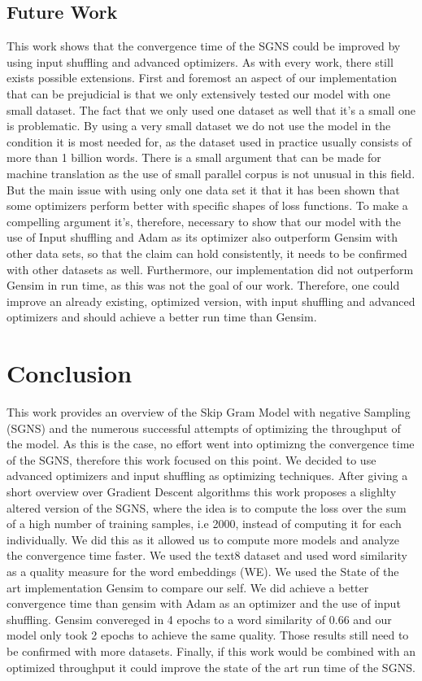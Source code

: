 \documentclass[conference]{IEEEtran}
\begin{document}
\subsection{Future Work}
This work shows that the convergence time of the SGNS could be improved by using input shuffling and advanced optimizers. As with every work, there still exists possible extensions. First and foremost an aspect of our implementation that can be prejudicial is that we only extensively tested our model with one small dataset. The fact that we only used one dataset as well that it's a small one is problematic. By using a very small dataset we do not use the model in the condition it is most needed for, as the dataset used in practice usually consists of more than 1 billion words. There is a small argument that can be made for machine translation as the use of small parallel corpus is not unusual in this field. But the main issue with using only one data set it that it has been shown that some optimizers perform better with specific shapes of loss functions. To make a compelling argument it's, therefore, necessary to show that our model with the use of Input shuffling and Adam as its optimizer also outperform Gensim with other data sets, so that the claim can hold consistently, it needs to be confirmed with other datasets as well.
Furthermore, our implementation did not outperform Gensim in run time, as this was not the goal of our work. Therefore, one could improve an already existing, optimized version, with input shuffling and advanced optimizers and should achieve a better run time than Gensim.
\section{Conclusion}\label{chap:conclusion}

This work provides an overview of the Skip Gram Model with negative Sampling (SGNS) and the numerous successful attempts of optimizing the throughput of the model. As this is the case, no effort went into optimizng the convergence time of the SGNS, therefore this work focused on this point. We decided to use advanced optimizers and input shuffling as optimizing techniques. After giving a short overview over Gradient Descent algorithms this work proposes a slighlty altered version of the SGNS, where the idea is to compute the loss over the sum of a high number of training samples, i.e 2000,  instead of computing it for each individually.  We did this as it allowed us to compute more models and analyze the convergence time faster. We used the text8 dataset and used  word similarity as a quality measure for the word embeddings (WE). We used the State of the art implementation Gensim to compare our self. We did achieve a better convergence time than gensim with Adam as an optimizer and the use of input shuffling. Gensim convereged in 4 epochs to a word similarity of 0.66 and our model only took 2 epochs to achieve the same quality. Those results still need to be confirmed with more datasets. Finally, if this work would be combined with an optimized throughput it  could improve the state of the art run time of the SGNS.
\end{document}
